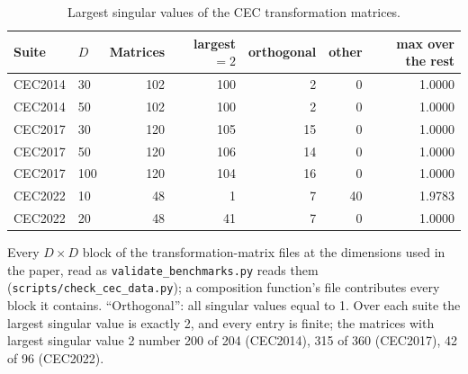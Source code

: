 \begin{table}[htbp]
\centering
\caption{Largest singular values of the CEC transformation matrices.}
\label{tab:supp_singular}
\begin{tabular}{llrrrrr}
\toprule
Suite & $D$ & Matrices & largest $=2$ & orthogonal & other & max over the rest \\
\midrule
CEC2014 & 30 & 102 & 100 & 2 & 0 & 1.0000 \\
CEC2014 & 50 & 102 & 100 & 2 & 0 & 1.0000 \\
CEC2017 & 30 & 120 & 105 & 15 & 0 & 1.0000 \\
CEC2017 & 50 & 120 & 106 & 14 & 0 & 1.0000 \\
CEC2017 & 100 & 120 & 104 & 16 & 0 & 1.0000 \\
CEC2022 & 10 & 48 & 1 & 7 & 40 & 1.9783 \\
CEC2022 & 20 & 48 & 41 & 7 & 0 & 1.0000 \\
\bottomrule
\end{tabular}
\begin{flushleft}\footnotesize
Every $D\times D$ block of the transformation-matrix files at the dimensions used in the paper, read as \texttt{validate\_benchmarks.py} reads them (\texttt{scripts/check\_cec\_data.py}); a composition function's file contributes every block it contains. ``Orthogonal'': all singular values equal to 1. Over each suite the largest singular value is exactly 2, and every entry is finite; the matrices with largest singular value 2 number 200 of 204 (CEC2014), 315 of 360 (CEC2017), 42 of 96 (CEC2022).
\end{flushleft}
\end{table}
